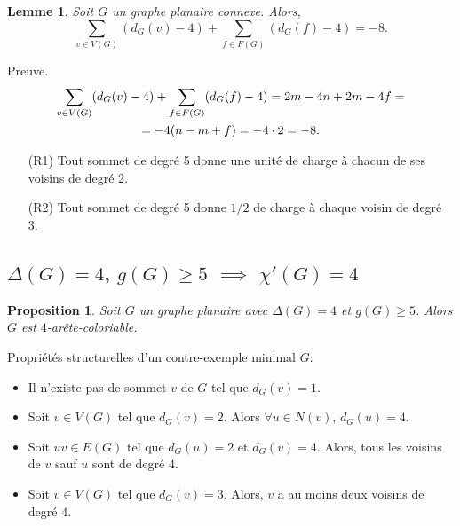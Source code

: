 \documentclass{beamer}
\newtheorem{lemme}{Lemme}
\newtheorem{proposition}{Proposition}
\begin{document}
\begin{frame}
\begin{lemme}
Soit $G$ un graphe planaire connexe. Alors,
$$ \sum_{v \in V(G)} (d_G(v) - 4) + \sum_{f\in F(G)} (d_G(f) -4) = -8.$$
\end{lemme}
Preuve.
$$
\gathered 
\sum_{v \in V(G)} (d_G(v) - 4) + \sum_{f\in F(G)} (d_G(f) -4) = 2m -4n + 2m - 4f = \\
 =-4(n - m + f) = -4\cdot 2 = -8.
\endgathered
$$
\end{frame}

\begin{frame}
\begin{enumerate}
\item[(R1)] Tout sommet de degré 5 donne une unité de charge à chacun de ses voisins de degré 2.
\item[(R2)] Tout sommet de degré 5 donne $1/2$ de charge à chaque voisin de degré 3.
\end{enumerate}
\end{frame}

\subsection{$\Delta(G)=4$, $g(G)\geq 5$ $\implies$ $\chi'(G)=4$}
\begin{frame}
\begin{proposition}
Soit $G$ un graphe planaire avec $\Delta(G) = 4$ et $g(G) \geq 5$. Alors $G$ est $4$-arête-coloriable.
\end{proposition}
Propriétés structurelles d'un contre-exemple minimal $G$:
\begin{itemize}
\item Il n'existe pas de sommet $v$ de $G$ tel que $d_G(v) = 1$.
\item Soit $v \in V(G)$ tel que $d_G(v) = 2$. Alors $\forall u \in N(v)$, $d_G(u) = 4$.
\item Soit $uv \in E(G)$ tel que $d_G(u) = 2$ et $d_G(v) = 4$. Alors, tous les voisins de $v$ sauf $u$ sont de degré $4$.
\item Soit $v \in V(G)$ tel que $d_G(v)=3$. Alors, $v$ a au moins deux voisins de degré $4$.
\end{itemize}
\end{frame}
\end{document}
